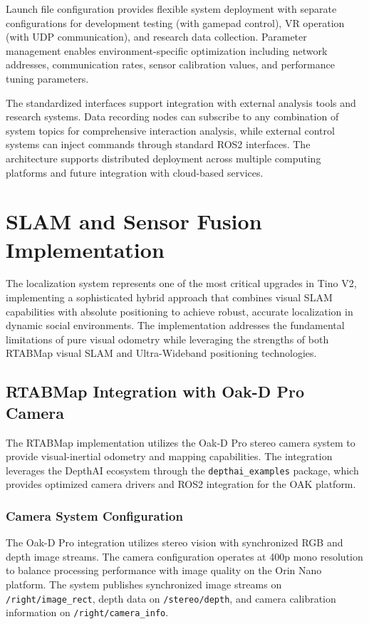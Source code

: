 Launch file configuration provides flexible system deployment with separate configurations for development testing (with gamepad control), VR operation (with UDP communication), and research data collection. Parameter management enables environment-specific optimization including network addresses, communication rates, sensor calibration values, and performance tuning parameters.

The standardized interfaces support integration with external analysis tools and research systems. Data recording nodes can subscribe to any combination of system topics for comprehensive interaction analysis, while external control systems can inject commands through standard ROS2 interfaces. The architecture supports distributed deployment across multiple computing platforms and future integration with cloud-based services.

\section{SLAM and Sensor Fusion Implementation}

The localization system represents one of the most critical upgrades in Tino V2, implementing a sophisticated hybrid approach that combines visual SLAM capabilities with absolute positioning to achieve robust, accurate localization in dynamic social environments. The implementation addresses the fundamental limitations of pure visual odometry while leveraging the strengths of both RTABMap visual SLAM and Ultra-Wideband positioning technologies.

\subsection{RTABMap Integration with Oak-D Pro Camera}

The RTABMap implementation utilizes the Oak-D Pro stereo camera system to provide visual-inertial odometry and mapping capabilities. The integration leverages the DepthAI ecosystem through the \texttt{depthai\_examples} package, which provides optimized camera drivers and ROS2 integration for the OAK platform.

\subsubsection{Camera System Configuration}

The Oak-D Pro integration utilizes stereo vision with synchronized RGB and depth image streams. The camera configuration operates at 400p mono resolution to balance processing performance with image quality on the Orin Nano platform. The system publishes synchronized image streams on \texttt{/right/image\_rect}, depth data on \texttt{/stereo/depth}, and camera calibration information on \texttt{/right/camera\_info}.

